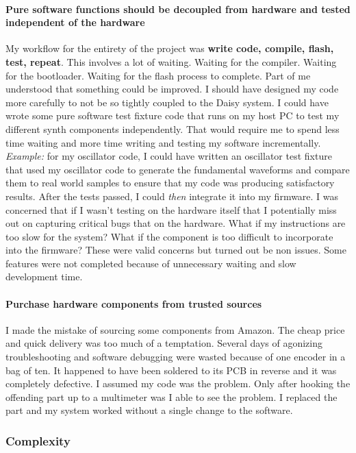 \documentclass[acmlarge,screen]{acmart}
\begin{document}
	\paragraph{Pure software functions should be decoupled from hardware and tested independent of the hardware} My workflow for the entirety of the project was \textbf{write code, compile, flash, test, repeat}. This involves a lot of waiting. Waiting for the compiler. Waiting for the bootloader. Waiting for the flash process to complete. Part of me understood that something could be improved. I should have designed my code more carefully to not be so tightly coupled to the Daisy system. I could have wrote some pure software test fixture code that runs on my host PC to test my different synth components independently. That would require me to spend less time waiting and more time writing and testing my software incrementally. \textit{Example:} for my oscillator code, I could have written an oscillator test fixture that used my oscillator code to generate the fundamental waveforms and compare them to real world samples to ensure that my code was producing satisfactory results. After the tests passed, I could \textit{then} integrate it into my firmware. I was concerned that if I wasn't testing on the hardware itself that I potentially miss out on capturing critical bugs that on the hardware. What if my instructions are too slow for the system? What if the component is too difficult to incorporate into the firmware? These were valid concerns but turned out be non issues. Some features were not completed because of unnecessary waiting and slow development time.
	
	\paragraph{Purchase hardware components from trusted sources} I made the mistake of sourcing some components from Amazon. The cheap price and quick delivery was too much of a temptation. Several days of agonizing troubleshooting and software debugging were wasted because of one encoder in a bag of ten. It happened to have been soldered to its PCB in reverse and it was completely defective. I assumed my code was the problem. Only after hooking the offending part up to a multimeter was I able to see the problem. I replaced the part and my system worked without a single change to the software.
	
	\subsubsection{Complexity}
\end{document}
